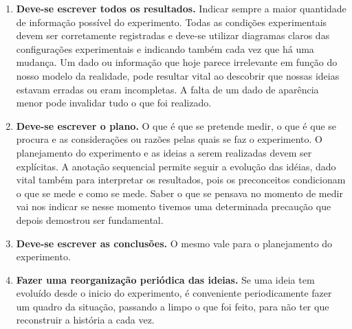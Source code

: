 \begin{enumerate}
\item {\bf Deve-se escrever todos os resultados.} Indicar sempre a maior quantidade de in\-for\-ma\-ção possível do experimento. Todas as condições experimentais devem ser corretamente registradas e deve-se utilizar diagramas claros das configurações experimentais e indicando também cada vez que há uma mudança. Um dado ou informação que hoje parece irrelevante em função do nosso modelo da realidade, pode resultar vital ao descobrir que nossas ideias estavam erradas ou eram incompletas. A falta de um dado de aparência menor pode invalidar tudo o que foi  realizado.

\item {\bf Deve-se escrever o plano.} O que é que se pretende medir, o que é que se procura e as considerações ou razões pelas quais se faz o experimento. O planejamento do experimento e as ideias a serem realizadas devem ser explícitas. A anotação sequencial permite seguir a evolução das idéias, dado vital também para interpretar os resultados, pois os preconceitos condicionam o que se mede e como se mede. Saber o que se pensava no momento de medir vai nos indicar se nesse momento tivemos uma determinada precaução que depois demostrou ser fundamental.

\item {\bf Deve-se escrever as conclusões.} O mesmo vale para o planejamento do experimento.

\item {\bf Fazer uma reorganização periódica das ideias.} Se uma ideia tem evoluído desde o inicio do experimento, é conveniente periodicamente fazer um quadro da situação, passando a limpo o que foi feito, para não ter que reconstruir a história a cada vez.

\end{enumerate}